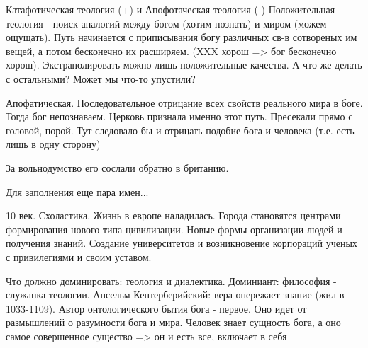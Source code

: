 Катафотическая теология (+) и Апофотаческая теология (-)
Положительная теология - поиск аналогий между богом (хотим познать) и миром (можем ощущать). Путь начинается с приписывания богу различных св-в сотвореных им вещей, а потом бесконечно их расширяем. (ХXX хорош => бог бесконечно хорош). Экстраполировать можно лишь положительные качества. А что же делать с остальными? Может мы что-то упустили?

Апофатическая. Последовательное отрицание всех свойств реального мира в боге. Тогда бог непознаваем. Церковь признала именно этот путь. Пресекали прямо с головой, порой. Тут следовало бы и отрицать подобие бога и человека (т.е. есть лишь в одну сторону)

За вольнодумство его сослали обратно в британию.

Для заполнения еще пара имен...


10 век. Схоластика.
Жизнь в европе наладилась. Города становятся центрами формирования нового типа цивилизации. Новые формы организации людей и получения знаний. Создание университетов и возникновение корпораций ученых с привилегиями и своим уставом.

Что должно доминировать: теология и диалектика.
Доминиант: философия - служанка теологии.
Ансельм Кентерберийский: вера опережает знание (жил в 1033-1109). Автор онтологического бытия бога - первое. Оно идет от размышлений о разумности бога и мира. Человек знает сущность бога, а оно самое совершенное существо => он и есть все, включает в себя
